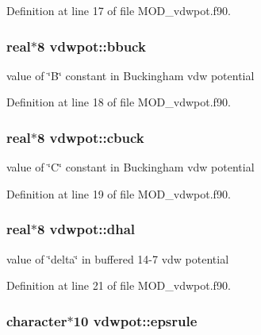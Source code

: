 Definition at line 17 of file M\-O\-D\-\_\-vdwpot.\-f90.

\hypertarget{classvdwpot_a34541a06361b2acf417096350278d297}{
\subsubsection[{bbuck}]{\setlength{\rightskip}{0pt plus 5cm}real$\ast$8 vdwpot\-::bbuck}}\label{classvdwpot_a34541a06361b2acf417096350278d297}


value of \char`\"{}\-B\char`\"{} constant in Buckingham vdw potential 



Definition at line 18 of file M\-O\-D\-\_\-vdwpot.\-f90.

\hypertarget{classvdwpot_a845eb8eaafc343c1d47fcdb0714d697f}{
\subsubsection[{cbuck}]{\setlength{\rightskip}{0pt plus 5cm}real$\ast$8 vdwpot\-::cbuck}}\label{classvdwpot_a845eb8eaafc343c1d47fcdb0714d697f}


value of \char`\"{}\-C\char`\"{} constant in Buckingham vdw potential 



Definition at line 19 of file M\-O\-D\-\_\-vdwpot.\-f90.

\hypertarget{classvdwpot_aa08419cc1dd5ce7068ae0d3064e0edff}{
\subsubsection[{dhal}]{\setlength{\rightskip}{0pt plus 5cm}real$\ast$8 vdwpot\-::dhal}}\label{classvdwpot_aa08419cc1dd5ce7068ae0d3064e0edff}


value of \char`\"{}delta\char`\"{} in buffered 14-\/7 vdw potential 



Definition at line 21 of file M\-O\-D\-\_\-vdwpot.\-f90.

\hypertarget{classvdwpot_ade451daaf049f4de024a0877e12545ce}{
\subsubsection[{epsrule}]{\setlength{\rightskip}{0pt plus 5cm}character$\ast$10 vdwpot\-::epsrule}}\label{classvdwpot_ade451daaf049f4de024a0877e12545ce}


